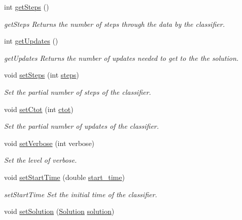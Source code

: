 \begin{DoxyCompactItemize}
int \hyperlink{class_classifier_a1fb3e4dfd80c154e89603c8fa1b11b76}{get\+Steps} ()
\begin{DoxyCompactList}\small\item\em get\+Steps Returns the number of steps through the data by the classifier. \end{DoxyCompactList}\item 
int \hyperlink{class_classifier_a738c2fbed982db6cad02062edcc037e4}{get\+Updates} ()
\begin{DoxyCompactList}\small\item\em get\+Updates Returns the number of updates needed to get to the the solution. \end{DoxyCompactList}\item 
void \hyperlink{class_classifier_a779b6cac0351e272ee0573d919d5d060}{set\+Steps} (int \hyperlink{class_classifier_a1e4c9c9ba059d5aff1d4d81eb41725cb}{steps})
\begin{DoxyCompactList}\small\item\em Set the partial number of steps of the classifier. \end{DoxyCompactList}\item 
void \hyperlink{class_classifier_a3293d7d39c3934503a23b920f84f73e7}{set\+Ctot} (int \hyperlink{class_classifier_a99d9a7f504212bb3dc2726c10a2333c6}{ctot})
\begin{DoxyCompactList}\small\item\em Set the partial number of updates of the classifier. \end{DoxyCompactList}\item 
void \hyperlink{class_classifier_a073b94029512378ccfae3aa34aae0212}{set\+Verbose} (int verbose)
\begin{DoxyCompactList}\small\item\em Set the level of verbose. \end{DoxyCompactList}\item 
void \hyperlink{class_classifier_a7f1cf3ac53b0593307a050368a912bb4}{set\+Start\+Time} (double \hyperlink{class_classifier_a4488a20bd7b4fc22d57244aaee57b002}{start\+\_\+time})
\begin{DoxyCompactList}\small\item\em set\+Start\+Time Set the initial time of the classifier. \end{DoxyCompactList}\item 
void \hyperlink{class_classifier_aef6cb633eed60712f8948a404f630e82}{set\+Solution} (\hyperlink{class_solution}{Solution} \hyperlink{class_classifier_a8e70651d36fa396f55028847acd6ae50}{solution})

\end{DoxyCompactItemize}
